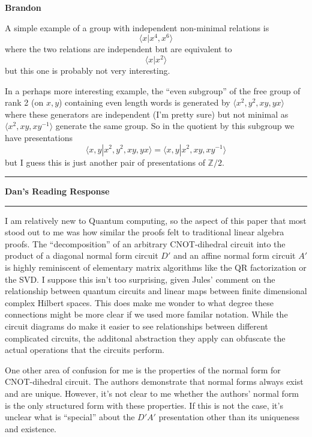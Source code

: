 \documentclass{amsart}
\newcommand{\iam}[1]{
  \vspace{0.25em}
  \hrule
  \vspace{0.25em}
  \textbf{{#1}'s Reading Response}
  \vspace{0.25em}
  \hrule
  \vspace{1em}
}
\newcommand{\respond}[1]{
  \vspace{1em} \textbf{#1}
}
\begin{document}
\respond{Brandon}

A simple example of a group with independent non-minimal relations is
$$\langle x | x^4, x^6 \rangle$$
where the two relations are independent but are equivalent to
$$\langle x | x^2 \rangle$$
but this one is probably not very interesting.

In a perhaps more interesting example, the ``even subgroup'' of the free group of rank 2 (on $x,y$) containing even length words is generated by $\langle x^2, y^2, xy, yx \rangle$ where these generators are independent (I'm pretty sure) but not minimal as $\langle x^2, xy, xy^{-1} \rangle$ generate the same group.  So in the quotient by this subgroup we have presentations
$$\langle x,y | x^2, y^2, xy, yx \rangle = \langle x,y | x^2, xy, xy^{-1} \rangle$$
but I guess this is just another pair of presentations of $\mathbb{Z}/2$.


\iam{Dan}

I am relatively new to Quantum computing, so the aspect of this paper that most stood out to me was how similar the proofs felt to traditional linear algebra proofs. The ``decomposition'' of an arbitrary CNOT-dihedral circuit into the product of a diagonal normal form circuit $D'$ and an affine normal form circuit $A'$ is highly reminiscent of elementary matrix algorithms like the QR factorization or the SVD. I suppose this isn't too surprising, given Jules' comment on the relationship between quantum circuits and linear maps between finite dimensional complex Hilbert spaces. This does make me wonder to what degree these connections might be more clear if we used more familar notation. While the circuit diagrams do make it easier to see relationships between different complicated circuits, the additonal abstraction they apply can obfuscate the actual operations that the circuits perform.

One other area of confusion for me is the properties of the normal form for CNOT-dihedral circuit. The authors demonstrate that normal forms always exist and are unique. However, it's not clear to me whether the authors' normal form is the only structured form with these properties. If this is not the case, it's unclear what is ``special'' about the $D'A'$ presentation other than its uniqueness and existence.
\end{document}
